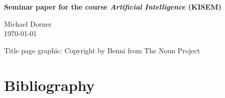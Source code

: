 \begin{titlepage}
\begin{center}
    \vspace{5em}

    {\sffamily \large \bfseries  Seminar paper for the course \textit{Artificial Intelligence} (KISEM)}\\[3em]


    {  \normalsize 
        Michael Dorner \\[2em]
        
        \today

    } 
\end{center}

\end{titlepage}


\newpage

\renewcommand{\contentsname}{Table of Content}
\tableofcontents
\vfill
\begin{center}
\small{Title page graphic: Copyright by Benni from The Noun Project}
\end{center}


\newpage








\setcounter{section}{0}
\renewcommand{\thesection}{\Alph{section}}



\newpage

\section{Bibliography}
\printbibliography[heading=none]






